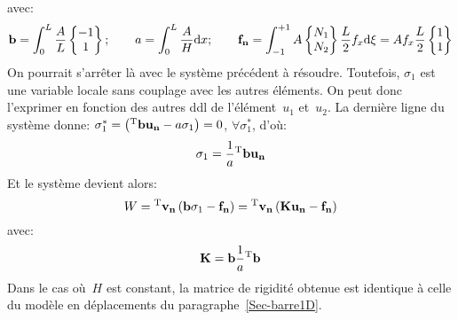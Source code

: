 avec:
\begin{equation}
\VV{b}=\dint_0^L \frac{A}L \VV*{-1\\1}; \qquad
a=\dint_0^L \frac{A}H \dd x; \qquad
\VV{f_n} = \dint_{-1}^{+1} A \VV*{N_1\\N_2} \frac{L}2 f_x \dd\xi =
 A f_x \frac{L}2 \VV*{1\\1}
\end{equation}
\medskipvm
On pourrait s'arrêter là avec le système précédent à résoudre.
Toutefois, $\sigma_1$ est une variable locale sans couplage avec les autres éléments.
On peut donc l'exprimer en fonction des autres ddl de l'élément~$u_1$ et~$u_2$.
La dernière ligne du système donne:
$\sigma_1^*=\left(\LL{b}\VV{u_n}-a\sigma_1\right)=0$, $\forall \sigma_1^*$,
d'où:
\begin{equation} \sigma_1 = \frac1a \LL{b}\VV{u_n} \end{equation}
\medskipvm
Et le système devient alors:
\begin{equation} W=\LL{v_n}\left( \VV{b}\sigma_1 -\VV{f_n}\right) =
\LL{v_n} \left( \MM{K}\VV{u_n}-\VV{f_n}\right) \end{equation}
avec:
\begin{equation} \MM{K}=\VV{b}\frac1a\LL{b} \end{equation}
Dans le cas où~$H$ est constant, la matrice de rigidité obtenue est identique à celle du modèle en déplacements du paragraphe~\ref{Sec-barre1D}.